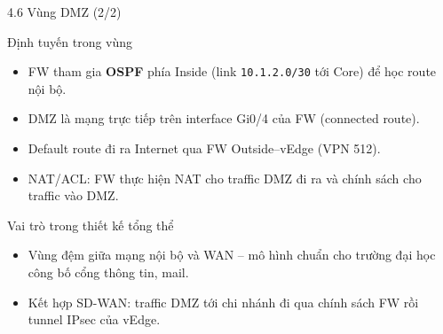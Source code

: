 \begin{frame}{4.6 Vùng DMZ (2/2)}
    \small
    \begin{block}{Định tuyến trong vùng}
        \begin{itemize}
            \item FW tham gia \textbf{OSPF} phía Inside (link
                  \texttt{10.1.2.0/30} tới Core) để học route nội bộ.
            \item DMZ là mạng trực tiếp trên interface Gi0/4 của FW
                  (connected route).
            \item Default route đi ra Internet qua FW
                  Outside--vEdge (VPN 512).
            \item NAT/ACL: FW thực hiện NAT cho traffic DMZ đi ra và
                  chính sách cho traffic vào DMZ.
        \end{itemize}
    \end{block}
    \vspace{0.12cm}
    \begin{block}{Vai trò trong thiết kế tổng thể}
        \begin{itemize}
            \item Vùng đệm giữa mạng nội bộ và WAN -- mô hình chuẩn cho
                  trường đại học công bố cổng thông tin, mail.
            \item Kết hợp SD-WAN: traffic DMZ tới chi nhánh đi qua
                  chính sách FW rồi tunnel IPsec của vEdge.
        \end{itemize}
    \end{block}
\end{frame}

